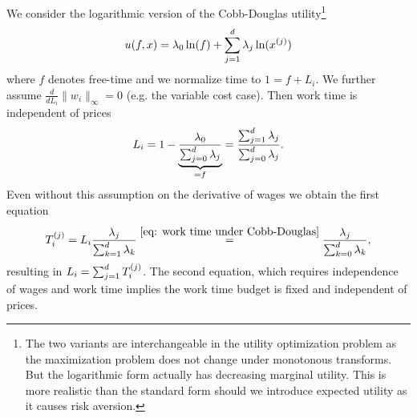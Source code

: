 \begin{lemma}
	We consider the logarithmic version of the Cobb-Douglas utility\footnote{
		The two variants are interchangeable in the utility optimization problem
		as the maximization problem does not change under monotonous transforms.
		But the logarithmic form actually has decreasing marginal utility. This is
		more realistic than the standard form should we introduce expected utility
		as it causes risk aversion.
	}
	\[
		u(f,x) = \lambda_0 \ln(f) + \sum_{j=1}^d \lambda_j \ln(x^{(j)})
	\]
	where \(f\) denotes free-time and we normalize time to \(1=f+L_i\). We
	further assume	 \(\frac{d}{dL_i}\|w_i\|_\infty=0\) (e.g. the variable cost
	case). Then work time is independent of prices
	\begin{equation}\label{eq: work time under Cobb-Douglas}
		L_i = 1- \underbrace{\frac{\lambda_0}{\sum_{j=0}^d \lambda_j}}_{=f}
		= \frac{\sum_{j=1}^d \lambda_j}{\sum_{j=0}^d \lambda_j}.
	\end{equation}
	Even without this assumption on the derivative of wages we obtain
	the first equation
	\[
		T_i^{(j)}
		= L_i\frac{\lambda_j}{\sum_{k=1}^d\lambda_k}
		\overset{\eqref{eq: work time under Cobb-Douglas}}=
		\frac{\lambda_j}{\sum_{k=0}^d\lambda_k},
	\]
	resulting in  \(L_i = \sum_{j=1}^d T_i^{(j)}\). The second equation,
	which requires independence of wages and work time implies the work time
	budget is fixed and independent of prices.
\end{lemma}
